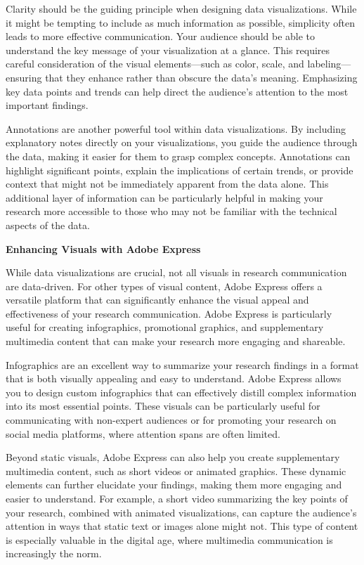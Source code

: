 \documentclass[
]{book}
\begin{document}
Clarity should be the guiding principle when designing data visualizations. While it might be tempting to include as much information as possible, simplicity often leads to more effective communication. Your audience should be able to understand the key message of your visualization at a glance. This requires careful consideration of the visual elements---such as color, scale, and labeling---ensuring that they enhance rather than obscure the data's meaning. Emphasizing key data points and trends can help direct the audience's attention to the most important findings.

Annotations are another powerful tool within data visualizations. By including explanatory notes directly on your visualizations, you guide the audience through the data, making it easier for them to grasp complex concepts. Annotations can highlight significant points, explain the implications of certain trends, or provide context that might not be immediately apparent from the data alone. This additional layer of information can be particularly helpful in making your research more accessible to those who may not be familiar with the technical aspects of the data.

\textbf{Enhancing Visuals with Adobe Express}

While data visualizations are crucial, not all visuals in research communication are data-driven. For other types of visual content, Adobe Express offers a versatile platform that can significantly enhance the visual appeal and effectiveness of your research communication. Adobe Express is particularly useful for creating infographics, promotional graphics, and supplementary multimedia content that can make your research more engaging and shareable.

Infographics are an excellent way to summarize your research findings in a format that is both visually appealing and easy to understand. Adobe Express allows you to design custom infographics that can effectively distill complex information into its most essential points. These visuals can be particularly useful for communicating with non-expert audiences or for promoting your research on social media platforms, where attention spans are often limited.

Beyond static visuals, Adobe Express can also help you create supplementary multimedia content, such as short videos or animated graphics. These dynamic elements can further elucidate your findings, making them more engaging and easier to understand. For example, a short video summarizing the key points of your research, combined with animated visualizations, can capture the audience's attention in ways that static text or images alone might not. This type of content is especially valuable in the digital age, where multimedia communication is increasingly the norm.
\end{document}

